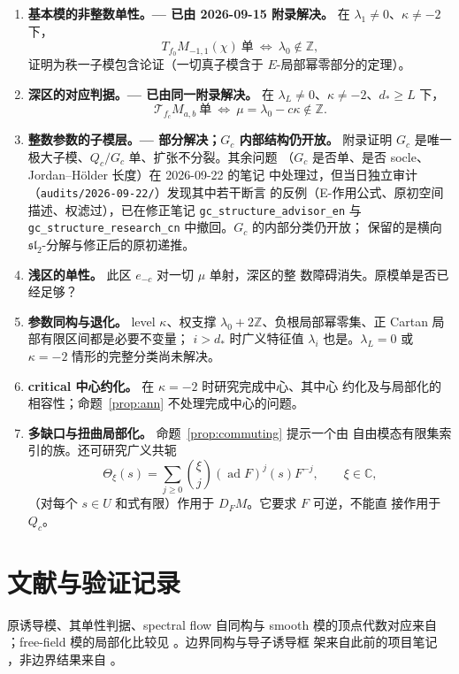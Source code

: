 \documentclass[UTF8,11pt]{ctexart}
\newcommand{\C}{\mathbb C}
\newcommand{\Z}{\mathbb Z}
\newcommand{\ad}{\operatorname{ad}}
\theoremstyle{definition}
\begin{document}
\begin{enumerate}[leftmargin=*,label=\arabic*.]
\item \textbf{基本模的非整数单性。--- 已由 2026-09-15 附录解决。} 在
\(\lambda_1\ne0\)、\(\kappa\ne-2\) 下，
\[
T_{f_0}M_{-1,1}(\chi)\ \text{单}\ \Longleftrightarrow\ \lambda_0\notin\Z,
\]
证明为秩一子模包含论证（一切真子模含于 \(E\)-局部幂零部分的定理）。
\item \textbf{深区的对应判据。--- 已由同一附录解决。} 在
\(\lambda_L\ne0\)、\(\kappa\ne-2\)、\(d_*\ge L\) 下，
\[
\mathcal T_{f_c}M_{a,b}\ \text{单}\ \Longleftrightarrow\
\mu=\lambda_0-c\kappa\notin\Z.
\]
\item \textbf{整数参数的子模层。--- 部分解决；\(G_c\) 内部结构仍开放。}
附录证明 \(G_c\) 是唯一极大子模、\(Q_c/G_c\) 单、扩张不分裂。其余问题
（\(G_c\) 是否单、是否 socle、Jordan--H\"older 长度）在 2026-09-22 的笔记
中处理过，但当日独立审计（\texttt{audits/2026-09-22/}）发现其中若干断言
的反例（E-作用公式、原初空间描述、权滤过），已在修正笔记
\texttt{gc\_structure\_advisor\_en} 与
\texttt{gc\_structure\_research\_cn} 中撤回。\(G_c\) 的内部分类仍开放；
保留的是横向 \(\mathfrak{sl}_2\)-分解与修正后的原初递推。
\item \textbf{浅区的单性。} 此区 \(e_{-c}\) 对一切 \(\mu\) 单射，深区的整
数障碍消失。原模单是否已经足够？
\item \textbf{参数同构与退化。} level \(\kappa\)、权支撑
\(\lambda_0+2\Z\)、负根局部幂零集、正 Cartan 局部有限区间都是必要不变量；
\(i>d_*\) 时广义特征值 \(\lambda_i\) 也是。\(\lambda_L=0\) 或 \(\kappa=-2\)
情形的完整分类尚未解决。
\item \textbf{critical 中心约化。} 在 \(\kappa=-2\) 时研究完成中心、其中心
约化及与局部化的相容性；命题~\ref{prop:ann} 不处理完成中心的问题。
\item \textbf{多缺口与扭曲局部化。} 命题~\ref{prop:commuting} 提示一个由
自由模态有限集索引的族。还可研究广义共轭
\[
\Theta_\xi(s)=\sum_{j\ge0}\binom{\xi}{j}(\ad F)^j(s)F^{-j},\qquad \xi\in\C,
\]
（对每个 \(s\in U\) 和式有限）作用于 \(D_FM\)。它要求 \(F\) 可逆，不能直
接作用于 \(Q_c\)。
\end{enumerate}

\section{文献与验证记录}\label{sec:verify}

原诱导模、其单性判据、spectral flow 自同构与 smooth 模的顶点代数对应来自
\cite{FGXZ}；free-field 模的局部化比较见 \cite{FGM}。边界同构与导子诱导框
架来自此前的项目笔记 \cite{Boundary,LivingV8}，非边界结果来自
\cite{Nonboundary}。
\end{document}
